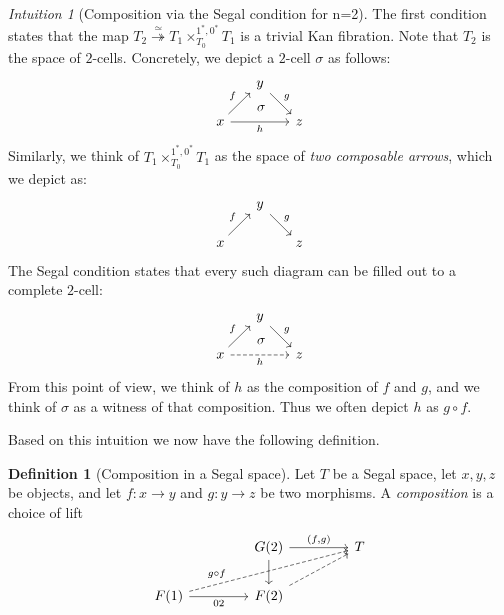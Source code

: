 \documentclass[11pt, a4paper]{amsart}
\theoremstyle{definition}
\newtheorem{definition}[equation]{Definition}
\theoremstyle{remark}
\newtheorem{intuition}[equation]{Intuition}
\numberwithin{equation}{section}
\begin{document}
\begin{intuition}[Composition via the Segal condition for n=2] \label{int:segal space n2}
  The first condition states that the map $T_2 \overset{\simeq}{\twoheadrightarrow} T_1 \times_{T_0}^{1^*,0^*} T_1$ is a trivial Kan fibration. Note that $T_2$ is the space of $2$-cells. Concretely, we depict a $2$-cell $\sigma$ as follows:
   \[
    \begin{tikzcd}[row sep=0.5cm, column sep=0.5cm]
     & y \arrow[dr, "g"]& \\
     x \arrow[rr, ""{name=U, above}, "h"'] \arrow[ur, "f"] & & z
     \arrow[start anchor={[xshift=-5ex, yshift=4ex]}, to=U, phantom, "\sigma"]
    \end{tikzcd}
   \]
   Similarly, we think of $T_1 \times_{T_0}^{1^*,0^*} T_1$ as the space of \emph{two composable arrows}, which we depict as:
    \[
    \begin{tikzcd}[row sep=0.5cm, column sep=0.5cm]
     & y \arrow[dr, "g"]& \\
     x \arrow[ur, "f"] & & z
    \end{tikzcd}
   \]
   The Segal condition states that every such diagram can be filled out to a complete $2$-cell: 
    \[
    \begin{tikzcd}[row sep=0.5cm, column sep=0.5cm]
     & y \arrow[dr, "g"]& \\
     x \arrow[rr, ""{name=U, above}, "h"', dashed] \arrow[ur, "f"] & & z
     \arrow[start anchor={[xshift=-5ex, yshift=4ex]}, to=U, phantom, "\sigma"]
    \end{tikzcd}
   \]
   From this point of view, we think of $h$ as the composition of $f$ and $g$, and we think of $\sigma$ as a witness of that composition.
   Thus we often depict $h$ as $g \circ f$.
\end{intuition}

Based on this intuition we now have the following definition.

\begin{definition}[Composition in a Segal space]
  Let $T$ be a Segal space, let $x,y,z$ be objects, and let $f\colon x \to y$ and $g\colon y \to z$ be two morphisms. A \emph{composition} is a choice of lift
  \[ 
   \begin{tikzcd}[column sep=1.5cm]
    & G(2) \arrow[r, "{(f,g)}"] \arrow[d] & T \\ 
    F(1) \arrow[r, "02"'] \arrow[urr, dashed, "g \circ f" near start] & F(2) \arrow[ur, dashed]
   \end{tikzcd}
  \]
\end{definition}
\end{document}

